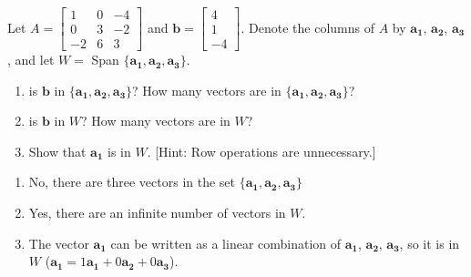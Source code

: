 \documentclass{../mathhomework}
\newcommand{\Vect}[1]{\pmb{#1}}
\begin{document}
\pagebreak
\begin{problem}[1.3\#25]
    Let $A = \begin{bmatrix}
        1 & 0 & -4 \\
        0 & 3 & -2 \\
        -2 & 6 & 3
    \end{bmatrix}$ and $\Vect{b} = \begin{bmatrix}4 \\ 1 \\ -4\end{bmatrix}$. Denote the columns of $A$ by $\Vect{a_1}$, $\Vect{a_2}$, $\Vect{a_3}$, and let $W = $ Span $\{\Vect{a_1},\Vect{a_2},\Vect{a_3}\}$.
    
    \begin{enumerate}[label=(\alph*)]
        \item is $\Vect{b}$ in $\{\Vect{a_1},\Vect{a_2},\Vect{a_3}\}$? How many vectors are in $\{\Vect{a_1},\Vect{a_2},\Vect{a_3}\}$?
        \item is $\Vect{b}$ in $W$? How many vectors are in $W$?
        \item Show that $\Vect{a_1}$ is in $W$. [Hint: Row operations are unnecessary.]
    \end{enumerate}

    \begin{solution}
        \begin{enumerate}[label=(\alph*)]
            \item No, there are three vectors in the set $\{\Vect{a_1}, \Vect{a_2}, \Vect{a_3}\}$
            \item Yes, there are an infinite number of vectors in $W$.
            \item The vector $\Vect{a_1}$ can be written as a linear combination of $\Vect{a_1}$, $\Vect{a_2}$, $\Vect{a_3}$, so it is in $W$ ($\Vect{a_1} = 1\Vect{a_1} + 0 \Vect{a_2} + 0 \Vect{a_3}$).
        \end{enumerate}
    \end{solution}
\end{problem}
\end{document}
